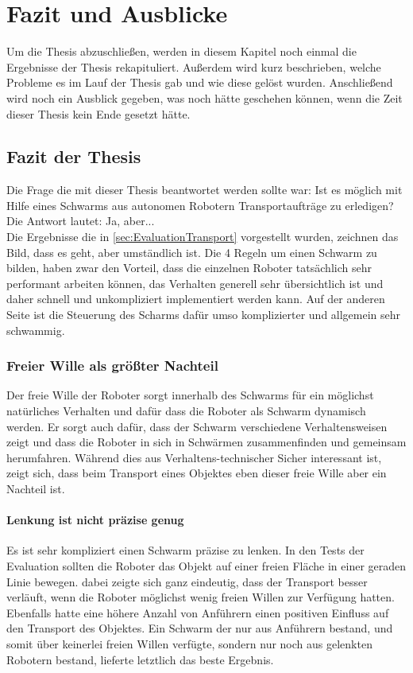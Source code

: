 \chapter{Fazit und Ausblicke}

Um die Thesis abzuschließen, werden in diesem Kapitel noch einmal die Ergebnisse der Thesis rekapituliert. Außerdem wird kurz beschrieben, welche Probleme es im Lauf der Thesis gab und wie diese gelöst wurden. Anschließend wird noch ein Ausblick gegeben, was noch hätte geschehen können, wenn die Zeit dieser Thesis kein Ende gesetzt hätte.

\section{Fazit der Thesis}

Die Frage die mit dieser Thesis beantwortet werden sollte war: Ist es möglich mit Hilfe eines Schwarms aus autonomen Robotern Transportaufträge zu erledigen? Die Antwort lautet: Ja, aber...\\

Die Ergebnisse die in \autoref{sec:EvaluationTransport} vorgestellt wurden, zeichnen das Bild, dass es geht, aber umständlich ist. Die 4 Regeln um einen Schwarm zu bilden, haben zwar den Vorteil, dass die einzelnen Roboter tatsächlich sehr performant arbeiten können, das Verhalten generell sehr übersichtlich ist und daher schnell und unkompliziert implementiert werden kann. Auf der anderen Seite ist die Steuerung des Scharms dafür umso komplizierter und allgemein sehr schwammig.

\subsection*{Freier Wille als größter Nachteil}
Der freie Wille der Roboter sorgt innerhalb des Schwarms für ein möglichst natürliches Verhalten und dafür dass die Roboter als Schwarm dynamisch werden. Er sorgt auch dafür, dass der Schwarm verschiedene Verhaltensweisen zeigt und dass die Roboter in sich in Schwärmen zusammenfinden und gemeinsam herumfahren. Während dies aus Verhaltens-technischer Sicher interessant ist, zeigt sich, dass beim Transport eines Objektes eben dieser freie Wille aber ein Nachteil ist.

\subsubsection*{Lenkung ist nicht präzise genug}
Es ist sehr kompliziert einen Schwarm präzise zu lenken. In den Tests der Evaluation sollten die Roboter das Objekt auf einer freien Fläche in einer geraden Linie bewegen. dabei zeigte sich ganz eindeutig, dass der Transport besser verläuft, wenn die Roboter möglichst wenig freien Willen zur Verfügung hatten. Ebenfalls hatte eine höhere Anzahl von Anführern einen positiven Einfluss auf den Transport des Objektes. Ein Schwarm der nur aus Anführern bestand, und somit über keinerlei freien Willen verfügte, sondern nur noch aus gelenkten Robotern bestand, lieferte letztlich das beste Ergebnis.

